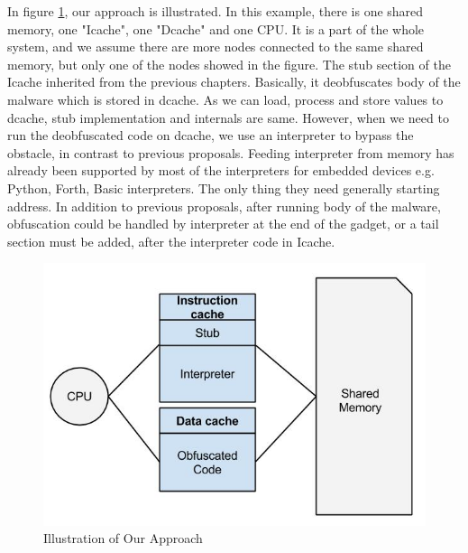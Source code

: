 	In figure \ref{fig:harvardsolution}, our approach is illustrated. In this example, there is one shared memory, one "Icache", one "Dcache" and one CPU. It is a part of the whole system, and we assume there are more nodes connected to the same shared memory, but only one of the nodes showed in the figure. The stub section of the Icache inherited from the previous chapters. Basically, it deobfuscates body of the malware  which is stored in dcache. As we can load, process and store values to dcache, stub implementation and internals are same. However, when we need to run the deobfuscated code on dcache, we use an interpreter to bypass the obstacle, in contrast to previous proposals. Feeding interpreter from memory has already been supported by most of the interpreters for embedded devices e.g. Python, Forth, Basic interpreters. The only thing they need generally starting address. In addition to previous proposals, after running body of the malware, obfuscation could be handled by interpreter at the end of the gadget, or a tail section must be added, after the interpreter code in Icache. 
	


	\begin{figure}[h!]
	\centering
	\includegraphics[width=1\textwidth]{img/Harvard_implementation.jpg}
	\caption{Illustration of Our Approach}
	\label{fig:harvardsolution}
	\end{figure}

